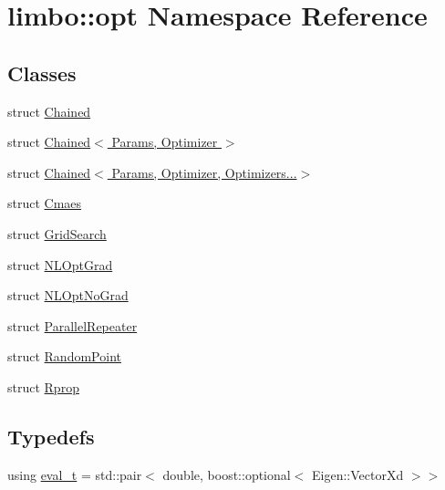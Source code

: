 \hypertarget{namespacelimbo_1_1opt}{}\section{limbo\+:\+:opt Namespace Reference}
\label{namespacelimbo_1_1opt}
\subsection*{Classes}
\begin{DoxyCompactItemize}
\item 
struct \hyperlink{structlimbo_1_1opt_1_1_chained}{Chained}
\item 
struct \hyperlink{structlimbo_1_1opt_1_1_chained_3_01_params_00_01_optimizer_01_4}{Chained$<$ Params, Optimizer $>$}
\item 
struct \hyperlink{structlimbo_1_1opt_1_1_chained_3_01_params_00_01_optimizer_00_01_optimizers_8_8_8_4}{Chained$<$ Params, Optimizer, Optimizers...$>$}
\item 
struct \hyperlink{structlimbo_1_1opt_1_1_cmaes}{Cmaes}
\item 
struct \hyperlink{structlimbo_1_1opt_1_1_grid_search}{Grid\+Search}
\item 
struct \hyperlink{structlimbo_1_1opt_1_1_n_l_opt_grad}{N\+L\+Opt\+Grad}
\item 
struct \hyperlink{structlimbo_1_1opt_1_1_n_l_opt_no_grad}{N\+L\+Opt\+No\+Grad}
\item 
struct \hyperlink{structlimbo_1_1opt_1_1_parallel_repeater}{Parallel\+Repeater}
\item 
struct \hyperlink{structlimbo_1_1opt_1_1_random_point}{Random\+Point}
\item 
struct \hyperlink{structlimbo_1_1opt_1_1_rprop}{Rprop}
\end{DoxyCompactItemize}
\subsection*{Typedefs}
\begin{DoxyCompactItemize}
\item 
using \hyperlink{group__opt__tools_ga362b55973a38ac71f27a06f9d9c14f24}{eval\+\_\+t} = std\+::pair$<$ double, boost\+::optional$<$ Eigen\+::\+Vector\+Xd $>$$>$
\end{DoxyCompactItemize}
